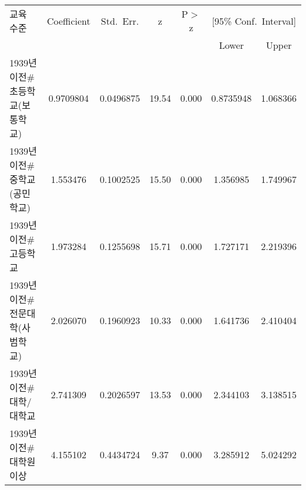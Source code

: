\begin{tabular}{lcccccc}
\toprule
교육 수준 & Coefficient & Std.~Err. & z & P$>$z & \multicolumn{2}{c}{[95\% Conf.~Interval]} \\
\cmidrule(lr){6-7}
 &  &  &  &  & Lower & Upper \\
\midrule
1939년 이전\#초등학교(보통학교) & 0.9709804 & 0.0496875 & 19.54 & 0.000 & 0.8735948 & 1.068366 \\
1939년 이전\#중학교(공민학교) & 1.553476  & 0.1002525 & 15.50 & 0.000 & 1.356985 & 1.749967 \\
1939년 이전\#고등학교 & 1.973284  & 0.1255698 & 15.71 & 0.000 & 1.727171 & 2.219396 \\
1939년 이전\#전문대학(사범학교) & 2.026070  & 0.1960923 & 10.33 & 0.000 & 1.641736 & 2.410404 \\
1939년 이전\#대학/대학교 & 2.741309  & 0.2026597 & 13.53 & 0.000 & 2.344103 & 3.138515 \\
1939년 이전\#대학원 이상 & 4.155102  & 0.4434724 & 9.37  & 0.000 & 3.285912 & 5.024292 \\
\bottomrule
\end{tabular}
